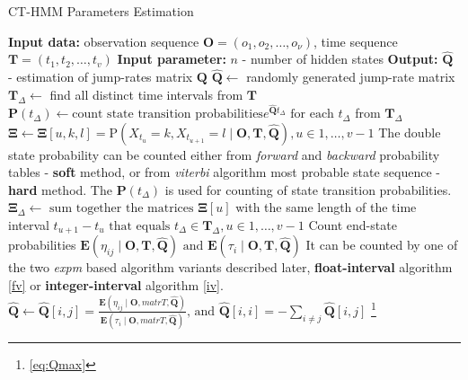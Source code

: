 \documentclass[thesis=M,english]{FITthesis}[2012/10/20]
\newcommand{\matr}[1]{\mathbf{#1}}
\begin{document}
\noindent\begin{minipage}{\textwidth} 
\renewcommand\footnoterule{}
\begin{algorithm}[H]
\caption{CT-HMM Parameters Estimation}\label{pe} 
\begin{algorithmic}[1]
\State \textbf{Input data:} observation sequence $\matr{O} = (o_1,o_2,\dots,o_{\nu})$, time sequence $\matr{T} = (t_1,t_2,\dots,t_v)$
\State \textbf{Input parameter:} $n$ - number of hidden states
\State \textbf{Output:} $\matr{\hat{Q}}$ - estimation of jump-rates matrix $\matr{Q}$
\State $\matr{\hat{Q}} \gets$ randomly generated jump-rate matrix
\State $\matr{T}_{\Delta} \gets$ find all distinct time intervals from $\matr{T}$
\Repeat
\State $\matr{P}({t_{\Delta}}) \gets \text{count state transition probabilities} e^{\matr{\hat Q}t_{\Delta}} \text{ for each } t_{\Delta} $ from $ \matr{T}_{\Delta}$
\State $\matr{\Xi} \gets \matr{\Xi}[u,k,l] = \mathrm{P}( X_{t_u} = k, X_{t_{u+1}} = l \mid \matr{O},\matr{T}, \matr{ \hat Q }),  u \in 1,\dots,v-1$
\State \Comment The double state probability can be counted either from \textit{forward} and \textit{backward} probability tables - \textbf{soft} method, or from \textit{viterbi} algorithm most probable state sequence - \textbf{hard} method. The $\matr{P}({t_{\Delta}})$ is used for counting of state transition probabilities. 
\State $\matr{\Xi}_{\Delta} \gets \text{ sum together the matrices } \matr{\Xi}[u]$ with the same length of the time interval $t_{u+1} - t_u \text{ that equals } t_{\Delta} \in \matr{T}_{\Delta}, u \in 1,\dots,v-1 $
\State Count end-state probabilities $\mathbf{E}(\eta_{ij} \mid \matr{O}, \matr{T}, \matr{ \hat Q } ) \text{ and } \mathbf{E}(\tau_{i} \mid \matr{O}, \matr{T}, \matr{ \hat Q })$
\State \Comment It can be counted by one of the two \textit{expm} based algorithm variants described later, \textbf{float-interval} algorithm \ref{fv} or \textbf{integer-interval} algorithm \ref{iv}.  
\State $\matr{\hat{Q}} \gets \matr{\hat{Q}}[i,j] = \frac{\mathbf{E}(\eta_{ij} \mid \matr{O}, matr{T}, \matr{ \hat Q } )}{\mathbf{E}(\tau_{i} \mid \matr{O}, matr{T}, \matr{ \hat Q })} \text{, and } \matr{\hat{Q}}[i,i] =  - \sum_{i \neq j} \matr{\hat{Q}}[i,j]$ \footnote{\label{refqmax}\eqref{eq:Qmax}}

\EndProcedure
\end{algorithmic}

\end{algorithm}

\end{minipage}
\end{document}
